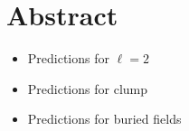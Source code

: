 \section{Abstract}
\begin{itemize}
\item Predictions for $\ell = 2$
\item Predictions for clump 
\item Predictions for buried fields
\end{itemize}